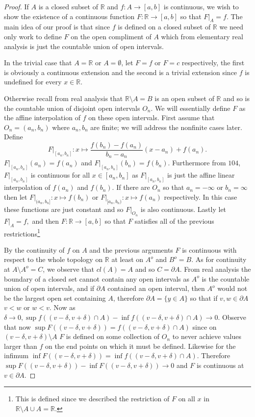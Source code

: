 \documentclass[11pt]{amsart}
\theoremstyle{definition}
\numberwithin{theorem}{section}
\numberwithin{definition}{section}
\numberwithin{equation}{section}
\begin{document}
\begin{proof}
	If $A$ is a closed subset of $\mathbb{R}$ and $f: A \to [a,b]$ is continuous, we wish to show the existence of a continuous function $F: \mathbb{R} \to [a,b]$ so that $F|_A = f.$ The main idea of our proof is that since $f$ is
	defined on a closed subset of $\mathbb{R}$ we need only work to define $F$ on the open compliment of $A$ which
	from elementary real analysis is just the countable union of open intervals.

	In the trivial case that $A = \mathbb{R}$ or $A = \emptyset$, let $F = f$ or $F = c$ respectively, the first is obviously a continuous extension and the second is a trivial extension since $f$ is undefined for every $x \in \mathbb{R}$. 

	Otherwise recall from real analysis that $\mathbb{R} \setminus A = B$ is an open subset of $\mathbb{R}$ and so is
	the countable union of disjoint open intervals $O_n$. We will essentially define $F$ as the affine interpolation of $f$ on these open intervals. First assume that $O_n = (a_n, b_n)$ where $a_n, b_n$ are finite; we will address the nonfinite cases later. Define $$F|_{[a_n,b_n]}: x \mapsto \frac{f(b_n) - f(a_n)}{b_n - a_n}(x - a_n) + f(a_n).$$
	$F|_{[a_n,b_n]}(a_n) = f(a_n)$ and $F|_{[a_n,b_n]}(b_n) = f(b_n)$. Furthermore from $104$, $F|_{[a_n,b_n]}$ is continuous for all $x \in {[a_n,b_n]}$ as $F|_{[a_n,b_n]}$ is just the affine linear interpolation of $f(a_n)$ and $f(b_n)$. If there are $O_n$ so that $a_n = -\infty$ or $b_n = \infty$ then  let $F|_{(a_n,b_n]}: x \mapsto f(b_n)$
	or $F|_{[a_n,b_n)}: x \mapsto f(a_n)$ respectively. In this case these functions are just constant and so $F|_{O_n}$ is also continuous. Lastly let $F|_A = f,$ and then $F: \mathbb{R} \to [a,b]$ so that $F$ satisfies all of the previous restrictions\footnote{This is defined since we described the restriction of $F$ on all $x$ in $\mathbb{R} \setminus A \cup A = \mathbb{R}.$}

	By the continuity of $f$ on $A$ and the previous arguments $F$ is continuous with respect to the whole topology on $\mathbb{R}$ at least on $A^o$ and $B^o = B.$ 
	As for continuity at $A \setminus A^o = C$, we observe that $cl(A) = A$ and so $C = \partial A$. From real analysis the boundary of a closed set cannot contain any open intervals as $A^o$ is the countable union of open intervals, and if $\partial A$ contained an open interval, then $A^o$ would not be the largest open set containing $A$, therefore $\partial A = \{y \in A\}$ so that if $v,w \in \partial A$ $v < w$ or $w < v$. Now as $\delta \to 0,  \sup f((v - \delta, v+ \delta) \cap A) - \inf f((v - \delta, v+ \delta) \cap A) \to 0$. Observe that now $\sup F((v - \delta, v+ \delta)) = f((v - \delta, v+ \delta) \cap A)$ since on $(v - \delta, v+ \delta) \setminus A$
	$F$ is defined on some collection of $O_n$ to never achieve values larger than $f$ on the end points on which it must be defined. Likewise for the infimum $\inf F((v - \delta, v+ \delta)) = \inf f((v - \delta, v+ \delta) \cap A)$. Therefore $\sup F((v - \delta, v+ \delta)) - \inf F((v - \delta, v+ \delta)) \to 0$ and $F$ is continuous at $v \in \partial A$.


\end{proof}
\end{document}
